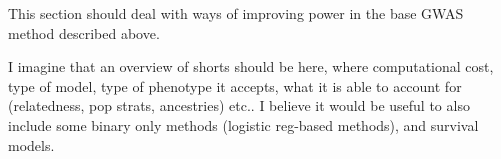 This section should deal with ways of improving power in the base GWAS method described above.

I imagine that an overview of shorts should be here, where computational cost, type of model, type of phenotype it accepts, what it is able to account for (relatedness, pop strats, ancestries) etc.. I believe it would be useful to also include some binary only methods (logistic reg-based methods), and survival models.